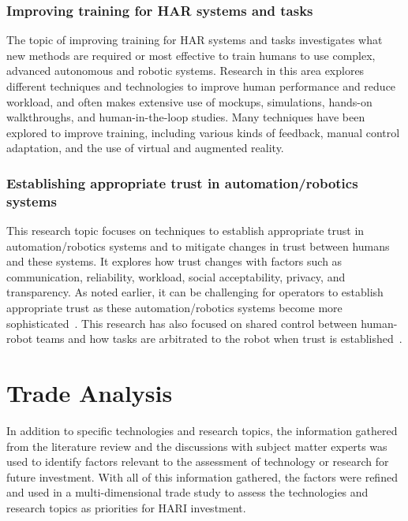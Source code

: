 \subsubsection{Improving training for HAR systems and tasks}
The topic of improving training for HAR systems and tasks investigates what new methods are required or most effective to train humans to use complex, advanced autonomous and robotic systems.
Research in this area explores different techniques and technologies to improve human performance and reduce workload, and often makes extensive use of mockups, simulations, hands-on walkthroughs, and human-in-the-loop studies.
Many techniques have been explored to improve training, including various kinds of feedback, manual control adaptation, and the use of virtual and augmented reality.

\subsubsection{Establishing appropriate trust in automation/robotics systems}
This research topic focuses on techniques to establish appropriate trust in automation/robotics systems and to mitigate changes in trust between humans and these systems.
It explores how trust changes with factors such as communication, reliability, workload, social acceptability, privacy, and transparency.
As noted earlier, it can be challenging for operators to establish appropriate trust as these automation/robotics systems become more sophisticated~\citep{chen_humanagent_2014}.
This research has also focused on shared control between human-robot teams and how tasks are arbitrated to the robot when trust is established~\citep{losey_review_2018}.

\section{Trade Analysis}
In addition to specific technologies and research topics, the information gathered from the literature review and the discussions with subject matter experts was used to identify factors relevant to the assessment of technology or research for future investment.
With all of this information gathered, the factors were refined and used in a multi-dimensional trade study to assess the technologies and research topics as priorities for HARI investment.

